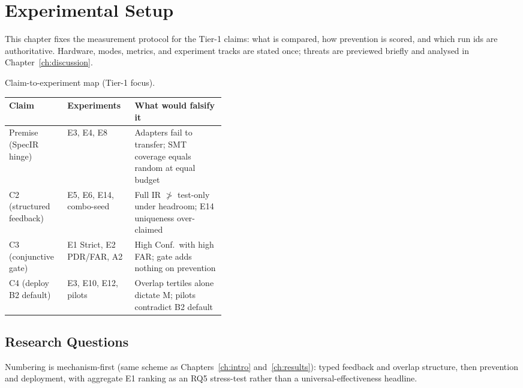 
\chapter{Experimental Setup}
\label{ch:experiments}

This chapter fixes the measurement protocol for the Tier-1 claims:
what is compared, how prevention is scored, and which run ids are
authoritative.
Hardware, modes, metrics, and experiment tracks are stated once;
threats are previewed briefly and analysed in Chapter~\ref{ch:discussion}.




\begin{inlinetable}{Claim-to-experiment map (Tier-1 focus).}
  \label{tab:claim-map}
  \footnotesize
  \begin{tabular}{llp{0.42\linewidth}}
    \toprule
    Claim & Experiments & What would falsify it \\
    \midrule
    Premise (SpecIR hinge) & E3, E4, E8 & Adapters fail to transfer; SMT
      coverage equals random at equal budget \\
    C2 (structured feedback) & E5, E6, E14, combo-seed & Full IR $\not>$
      test-only under headroom; E14 uniqueness over-claimed \\
    C3 (conjunctive gate) & E1 Strict, E2 PDR/FAR, A2 & High Conf.\ with
      high FAR; gate adds nothing on prevention \\
    C4 (deploy B2 default) & E3, E10, E12, pilots & Overlap tertiles alone
      dictate M; pilots contradict B2 default \\
    \bottomrule
  \end{tabular}
\end{inlinetable}

\section{Research Questions}
\label{sec:exp:rq}

Numbering is mechanism-first (same scheme as Chapters~\ref{ch:intro}
and~\ref{ch:results}): typed feedback and overlap structure, then
prevention and deployment, with aggregate E1 ranking as an RQ5
stress-test rather than a universal-effectiveness headline.

